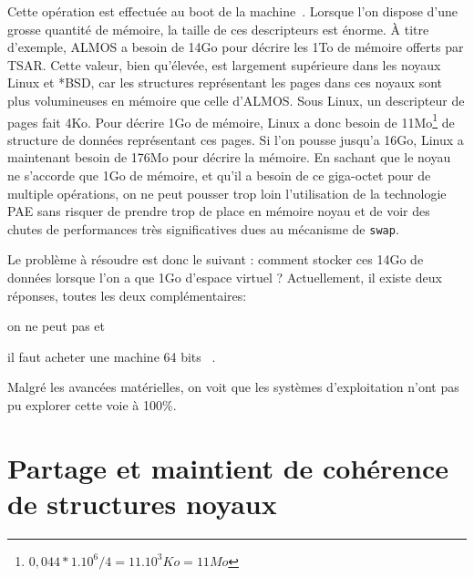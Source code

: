       Cette opération est effectuée au boot de la machine~\citep{cranor1999uvm,
        gorman2004understanding, russinovich2012windows,
        dillon2000design}. Lorsque l’on dispose d’une grosse quantité de
      mémoire, la taille de ces descripteurs est énorme. À titre d’exemple,
      ALMOS a besoin de 14Go pour décrire les 1To de mémoire offerts par
      TSAR. Cette valeur, bien qu’élevée, est largement supérieure dans les
      noyaux Linux et *BSD, car les structures représentant les pages
      dans ces noyaux sont plus volumineuses en mémoire que celle d’ALMOS. Sous
      Linux, un descripteur de pages fait 4Ko. Pour décrire 1Go de mémoire,
      Linux a donc besoin de 11Mo\footnote{$0,044*1.10^6/4 = 11.10^3Ko = 11Mo$}
      de structure de données représentant ces pages. Si l'on pousse jusqu'a
      16Go, Linux a maintenant besoin de 176Mo pour décrire la mémoire. En
      sachant que le noyau ne s'accorde que 1Go de mémoire, et qu'il a besoin de
      ce giga-octet pour de multiple opérations, on ne peut pousser trop loin
      l'utilisation de la technologie PAE sans risquer de prendre trop de place
      en mémoire noyau et de voir des chutes de performances très significatives
      dues au mécanisme de \texttt{swap}.

      Le problème à résoudre est donc le suivant : comment stocker ces 14Go de
      données lorsque l’on a que 1Go d’espace virtuel ?  Actuellement, il existe
      deux réponses, toutes les deux complémentaires: \benumline \item on ne
      peut pas et \item il faut acheter une machine 64
      bits~\citep{gorman2004understanding} \eenumline.

      Malgré les avancées matérielles, on voit que les systèmes d'exploitation
      n'ont pas pu explorer cette voie à 100\%.


  \section{Partage et maintient de cohérence de structures noyaux}
  \label{sec:consistency}
  




